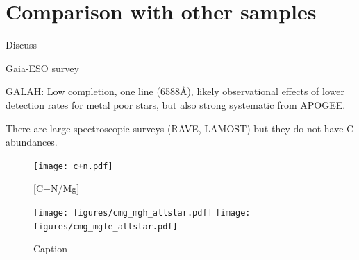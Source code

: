 \documentclass[fleqn,
usenatbib]{mnras}
\begin{document}
\appendix


\section{Comparison with other samples}

Discuss
\begin{description}
    \item \citet{vincenzo+21}
    \item Gaia-ESO survey
    \item \citet{bensby+21}
    \item \citet{weinberg+22}
    \item GALAH: Low completion, one line (6588Å), likely observational effects of lower detection rates for metal poor stars, but also strong systematic from APOGEE.
    \end{description}

    There are large spectroscopic surveys (RAVE, LAMOST)  but they do not have C abundances.

\begin{figure}
    \centering
    \texttt{[image: c+n.pdf]}
    \caption{[C+N/Mg]}
    \label{fig:cn}
\end{figure}

\begin{figure}
    \centering
    \texttt{[image: figures/cmg\_mgh\_allstar.pdf]}
    \texttt{[image: figures/cmg\_mgfe\_allstar.pdf]}
    \caption{Caption}
    \label{fig:enter-label}
\end{figure}

\bsp	%
\label{lastpage}
\end{document}
